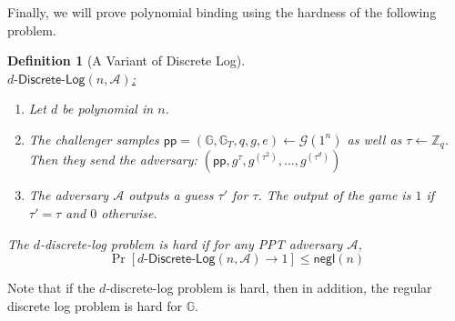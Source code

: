 \documentclass[11pt]{article}
\newcommand{\A}{\mathcal{A}}
\newcommand{\G}{\mathcal{G}}
\newcommand{\GG}{\mathbb{G}}
\newcommand{\pp}{\mathsf{pp}}
\newcommand{\ZZ}{\mathbb{Z}}
\newcommand{\negl}{\mathsf{negl}}
\newtheorem{definition}[theorem]{Definition}
\numberwithin{equation}{section}
\begin{document}
Finally, we will prove polynomial binding using the hardness of the following problem.
\begin{definition}[A Variant of Discrete Log]\label{def:d-discrete-log}
$ $\\
\noindent\underline{$d\text{-}\mathsf{Discrete}\text{-}\mathsf{Log}(n, \A)$:}
\begin{enumerate}
    \item Let $d$ be polynomial in $n$. 
    \item The challenger samples $\pp = (\GG, \GG_T, q, g, e) \leftarrow \G(1^n)$ as well as $\tau \leftarrow \ZZ_q$. Then they send the adversary:
    $\left(\pp, g^{\tau}, g^{(\tau^2)}, \dots, g^{(\tau^{d})}\right)$
    \item The adversary $\A$ outputs a guess $\tau'$ for $\tau$. The output of the game is $1$ if $\tau' = \tau$ and $0$ otherwise.
\end{enumerate}
The $d$-discrete-log problem is hard if for any PPT adversary $\A$, 
\[\Pr[d\text{-}\mathsf{Discrete}\text{-}\mathsf{Log}(n, \A) \to 1] \leq \negl(n)\]
\end{definition}
Note that if the $d$-discrete-log problem is hard, then in addition, the regular discrete log problem is hard for $\GG$.
\end{document}
